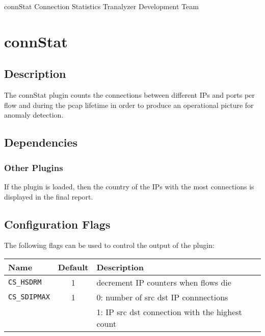 \documentclass[documentation]{subfiles}
\begin{document}
\trantitle
    {connStat}
    {Connection Statistics}
    {Tranalyzer Development Team} %

\section{connStat}\label{s:connStat}

\subsection{Description}
The connStat plugin counts the connections between different IPs and ports per flow and during the pcap lifetime
in order to produce an operational picture for anomaly detection. %

\subsection{Dependencies}

\subsubsection{Other Plugins}
If the  plugin is loaded, then the country of the IPs with the most connections is displayed in the final report.



\subsection{Configuration Flags}
The following flags can be used to control the output of the plugin:
\begin{longtable}{lcl}
    \toprule
    {\bf Name} & {\bf Default} & {\bf Description} \\
    \midrule\endhead%
    {\tt CS\_HSDRM}   & 1 & decrement IP counters when flows die \\
    {\tt CS\_SDIPMAX} & 1 & 0: number of src dst IP connnections \\
                      &   & 1: IP src dst connection with the highest count\\
    \bottomrule
\end{longtable}
\end{document}
